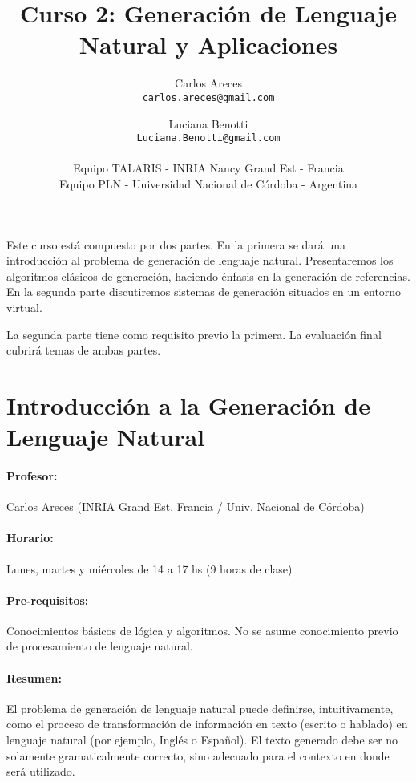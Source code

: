 \documentclass[a4paper]{article}
\begin{document}
\setcounter{page}{1}

\title{Curso 2: Generaci\'on de Lenguaje Natural y Aplicaciones}
\author{Carlos Areces\\
  {\tt carlos.areces@gmail.com} 
\and 
Luciana Benotti\\
  {\tt Luciana.Benotti@gmail.com} \\
 \ \\
  Equipo TALARIS - INRIA Nancy Grand Est - Francia\\
  Equipo PLN - Universidad Nacional de C\'ordoba - Argentina
}


\maketitle

Este curso est\'a compuesto por dos partes. En la primera se dar\'a una introducci\'on al problema de generaci\'on de lenguaje natural. Presentaremos los algoritmos cl\'asicos de generaci\'on, haciendo \'enfasis en la generaci\'on de referencias. En la segunda parte discutiremos sistemas de generaci\'on situados en un entorno virtual.

La segunda parte tiene como requisito previo la primera. La evaluaci\'on final cubrir\'a temas de ambas partes.

\section{Introducci\'on a la Generaci\'on de Lenguaje Natural}

\paragraph{Profesor:} Carlos Areces (INRIA Grand Est, Francia / Univ. Nacional de C\'ordoba)

\paragraph{Horario:} Lunes, martes y mi\'ercoles de 14 a 17 hs (9 horas de clase)

\paragraph{Pre-requisitos:} Conocimientos b\'asicos de l\'ogica y algoritmos. No se asume conocimiento previo de procesamiento de lenguaje natural.

\paragraph{Resumen:} El problema de generaci\'on de lenguaje natural puede definirse, intuitivamente, como el proceso de transformaci\'on de informaci\'on en texto (escrito o hablado) en lenguaje natural (por ejemplo, Ingl\'es o Español). El texto generado debe ser no solamente gramaticalmente correcto, sino adecuado para el contexto en donde ser\'a utilizado.
\end{document}
